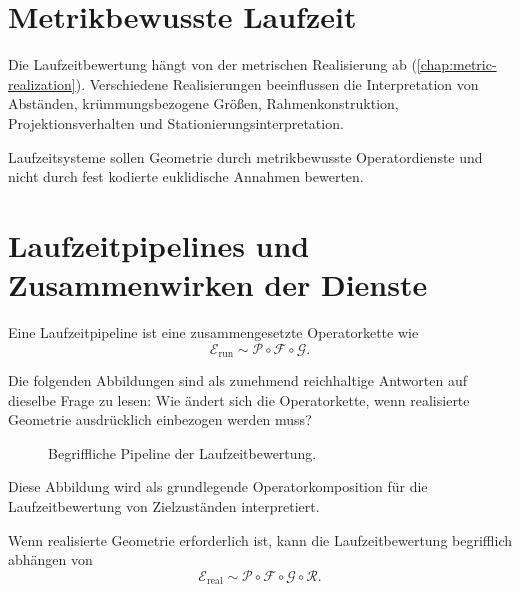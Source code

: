 \section{Metrikbewusste Laufzeit}

Die Laufzeitbewertung hängt von der metrischen Realisierung ab
(\cref{chap:metric-realization}). Verschiedene Realisierungen beeinflussen die
Interpretation von Abständen, krümmungsbezogene Größen, Rahmenkonstruktion,
Projektionsverhalten und Stationierungsinterpretation.

\begin{principle}
\label{princ:metric-aware-runtime}
Laufzeitsysteme sollen Geometrie durch metrikbewusste Operatordienste und
nicht durch fest kodierte euklidische Annahmen bewerten.
\end{principle}

\section{Laufzeitpipelines und Zusammenwirken der Dienste}

\begin{definition}
\label{def:runtime-pipeline}
Eine Laufzeitpipeline ist eine zusammengesetzte Operatorkette wie
\[
\mathcal E_{\mathrm{run}}
\sim
\mathcal P
\circ
\mathcal F
\circ
\mathcal G.
\]
\end{definition}

Die folgenden Abbildungen sind als zunehmend reichhaltige Antworten auf
dieselbe Frage zu lesen: Wie ändert sich die Operatorkette, wenn realisierte
Geometrie ausdrücklich einbezogen werden muss?

\begin{figure}[ht]
\centering

\caption{Begriffliche Pipeline der Laufzeitbewertung.}
\label{fig:runtime-pipeline}
\end{figure}

Diese Abbildung wird als grundlegende Operatorkomposition für die
Laufzeitbewertung von Zielzuständen interpretiert.

\begin{definition}
\label{def:realized-runtime-pipeline}
Wenn realisierte Geometrie erforderlich ist, kann die Laufzeitbewertung
begrifflich abhängen von
\[
\mathcal E_{\mathrm{real}}
\sim
\mathcal P
\circ
\mathcal F
\circ
\mathcal G
\circ
\mathcal R.
\]
\end{definition}

